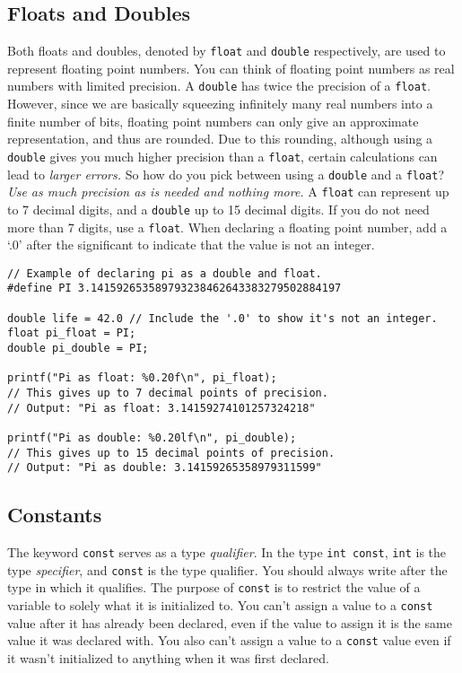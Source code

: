 \documentclass[11pt]{article}
\begin{document}
\subsection{Floats and Doubles}
\noindent Both floats and doubles, denoted by \texttt{float} and \texttt{double}
respectively, are used to represent floating point numbers. You can think of
floating point numbers as real numbers with limited precision. A
\texttt{double} has twice the precision of a \texttt{float}. However, since we
are basically squeezing infinitely many real numbers into a finite number of
bits, floating point numbers can only give an approximate representation, and
thus are rounded. Due to this rounding, although using a \texttt{double} gives
you much higher precision than a \texttt{float}, certain calculations can lead
to \emph{larger errors.} So how do you pick between using a \texttt{double} and
a \texttt{float}? \emph{Use as much precision as is needed and nothing more.} A
\texttt{float} can represent up to 7 decimal digits, and a \texttt{double} up to
15 decimal digits. If you do not need more than 7 digits, use a \texttt{float}. When
declaring a floating point number, add a `.0' after the significant to indicate
that the value is not an integer.
\begin{lstlisting}
// Example of declaring pi as a double and float.
#define PI 3.141592653589793238462643383279502884197

double life = 42.0 // Include the '.0' to show it's not an integer.
float pi_float = PI;
double pi_double = PI;

printf("Pi as float: %0.20f\n", pi_float);
// This gives up to 7 decimal points of precision.
// Output: "Pi as float: 3.14159274101257324218"

printf("Pi as double: %0.20lf\n", pi_double);
// This gives up to 15 decimal points of precision.
// Output: "Pi as double: 3.14159265358979311599"
\end{lstlisting}

\subsection{Constants}
The keyword \texttt{const} serves as a type \emph{qualifier}. In the type \texttt{int
const}, \texttt{int} is the type \emph{specifier}, and \texttt{const} is the type
qualifier. You should always write after the type in which it qualifies.
The purpose of \texttt{const} is to restrict the value of a variable to solely
what it is initialized to. You can't assign a value to a \texttt{const}
value after it has already been declared, even if the value to assign it is the
same value it was declared with. You also can't assign a value to a
\texttt{const} value even if it wasn't initialized to anything when it was
first declared.
\end{document}
